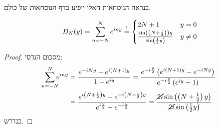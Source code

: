 \documentclass[name=רשימות חדו''א 2א]{../../../tex/classes/noChapterMegasumPreamble}
\begin{document}
	כנראה הנוסחאות האלו יופיע בדף הנוסחאות של כולם.
	\begin{Lemma}
		\[ D_N(y) = \sum_{n = -N}^{N}e^{iny} \overset{!}{=} \begin{cases}
			2N + 1 & y = 0 \\
			\frac{\sin\left ( \left ( N + \frac{1}{2} \right ) \right )y}{\sin\left ( \frac{1}{2}y \right )} & y \neq 0
		\end{cases} \]
	\end{Lemma}\begin{proof}
		מסכום הנדסי:
		\begin{align*}
			\sum_{\mathclap{n = -N}}^{N}e^{iny} &= \frac{e^{-iNy} - e^{i(N + 1)y}}{1 - e^{iy}} = \frac{e^{-i\frac{y}{2}}\cl{e^{i(N + 1)y} - e^{-iNy}}}{e^{-i\frac{y}{2}}\cl{e^{iy} - 1}} \\
			&= \frac{e^{i\cl{N + \frac{1}{2}}y} - e^{-i\cl{N + \frac{1}{2}}y}}{e^{i\frac{y}{2}} - e^{-i\frac{y}{2}}} = \frac{\cancel{2i}\sin\cl{\cl{N + \frac{1}{2}}y}}{\cancel{2i}\sin\cl{\frac{1}{2}y}}
		\end{align*}
		כנדרש.
	\end{proof}
\end{document}
